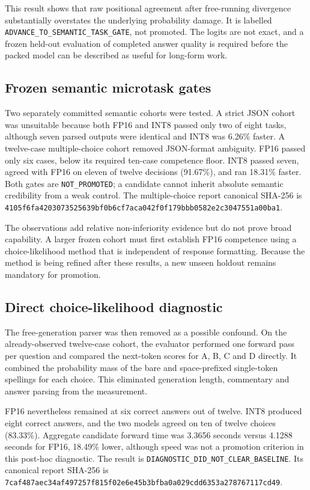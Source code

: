 This result shows that raw positional agreement after free-running divergence
substantially overstates the underlying probability damage. It is labelled
\texttt{ADVANCE\_TO\_SEMANTIC\_TASK\_GATE}, not promoted. The logits are not
exact, and a frozen held-out evaluation of completed answer quality is required
before the packed model can be described as useful for long-form work.

\subsection{Frozen semantic microtask gates}

Two separately committed semantic cohorts were tested. A strict JSON cohort
was unsuitable because both FP16 and INT8 passed only two of eight tasks,
although seven parsed outputs were identical and INT8 was 6.26\% faster. A
twelve-case multiple-choice cohort removed JSON-format ambiguity. FP16 passed
only six cases, below its required ten-case competence floor. INT8 passed seven,
agreed with FP16 on eleven of twelve decisions (91.67\%), and ran 18.31\%
faster. Both gates are \texttt{NOT\_PROMOTED}; a candidate cannot inherit
absolute semantic credibility from a weak control. The multiple-choice report
canonical SHA-256 is
\texttt{4105f6fa4203073525639bf0b6cf7aca042f0f179bbb0582e2c3047551a00ba1}.

The observations add relative non-inferiority evidence but do not prove broad
capability. A larger frozen cohort must first establish FP16 competence using a
choice-likelihood method that is independent of response formatting. Because
the method is being refined after these results, a new unseen holdout remains
mandatory for promotion.

\subsection{Direct choice-likelihood diagnostic}

The free-generation parser was then removed as a possible confound. On the
already-observed twelve-case cohort, the evaluator performed one forward pass
per question and compared the next-token scores for A, B, C and D directly. It
combined the probability mass of the bare and space-prefixed single-token
spellings for each choice. This eliminated generation length, commentary and
answer parsing from the measurement.

FP16 nevertheless remained at six correct answers out of twelve. INT8 produced
eight correct answers, and the two models agreed on ten of twelve choices
(83.33\%). Aggregate candidate forward time was 3.3656 seconds versus 4.1288
seconds for FP16, 18.49\% lower, although speed was not a promotion criterion in
this post-hoc diagnostic. The result is
\texttt{DIAGNOSTIC\_DID\_NOT\_CLEAR\_BASELINE}. Its canonical report SHA-256 is
\texttt{7caf487aec34af497257f815f02e6e45b3bfba0a029cdd6353a278767117cd49}.

